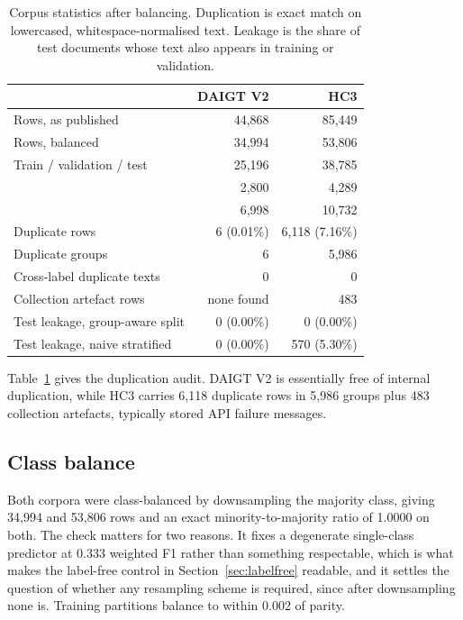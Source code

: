 \documentclass[conference,a4paper]{IEEEtran}
\begin{document}
\begin{table}[!ht]
\centering
\caption{Corpus statistics after balancing. Duplication is exact match on lowercased, whitespace-normalised text. Leakage is the share of test documents whose text also appears in training or validation.}
\label{tab:corpora}
\footnotesize
\setlength{\tabcolsep}{3.5pt}
\begin{tabular}{@{}lrr@{}}
\toprule
& DAIGT V2 & HC3 \\
\midrule
Rows, as published & 44,868 & 85,449 \\
Rows, balanced & 34,994 & 53,806 \\
Train / validation / test & 25,196 & 38,785 \\
& 2,800 & 4,289 \\
& 6,998 & 10,732 \\
\midrule
Duplicate rows & 6 (0.01\%) & 6,118 (7.16\%) \\
Duplicate groups & 6 & 5,986 \\
Cross-label duplicate texts & 0 & 0 \\
Collection artefact rows & none found & 483 \\
\midrule
Test leakage, group-aware split & 0 (0.00\%) & 0 (0.00\%) \\
Test leakage, naive stratified & 0 (0.00\%) & 570 (5.30\%) \\
\bottomrule
\end{tabular}
\end{table}

Table~\ref{tab:corpora} gives the duplication audit. DAIGT V2 is essentially free of internal duplication, while HC3 carries 6,118 duplicate rows in 5,986 groups plus 483 collection artefacts, typically stored API failure messages.

\subsection{Class balance}

Both corpora were class-balanced by downsampling the majority class, giving 34,994 and 53,806 rows and an exact minority-to-majority ratio of 1.0000 on both. The check matters for two reasons. It fixes a degenerate single-class predictor at 0.333 weighted F1 rather than something respectable, which is what makes the label-free control in Section~\ref{sec:labelfree} readable, and it settles the question of whether any resampling scheme is required, since after downsampling none is. Training partitions balance to within 0.002 of parity.
\end{document}
